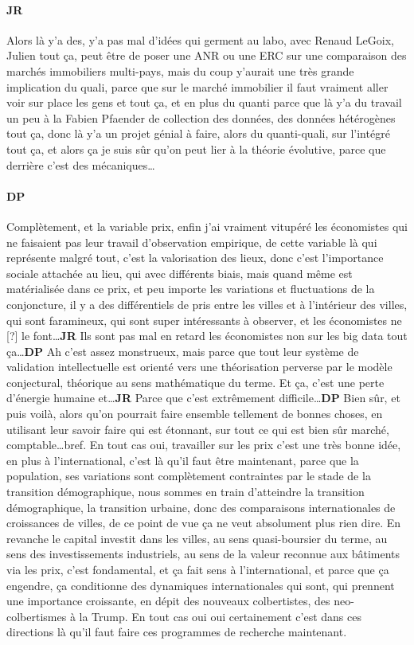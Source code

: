 \documentclass[12pt]{article}
\begin{document}
\paragraph{JR}

Alors là y'a des, y'a pas mal d'idées qui germent au labo, avec Renaud LeGoix, Julien tout ça, peut être de poser une ANR ou une ERC sur une comparaison des marchés immobiliers multi-pays, mais du coup y'aurait une très grande implication du quali, parce que sur le marché immobilier il faut vraiment aller voir sur place les gens et tout ça, et en plus du quanti parce que là y'a du travail un peu à la Fabien Pfaender de collection des données, des données hétérogènes tout ça, donc là y'a un projet génial à faire, alors du quanti-quali, sur l'intégré tout ça, et alors ça je suis sûr qu'on peut lier à la théorie évolutive, parce que derrière c'est des mécaniques\ldots

\paragraph{DP}

Complètement, et la variable prix, enfin j'ai vraiment vitupéré les économistes qui ne faisaient pas leur travail d'observation empirique, de cette variable là qui représente malgré tout, c'est la valorisation des lieux, donc c'est l'importance sociale attachée au lieu, qui avec différents biais, mais quand même est matérialisée dans ce prix, et peu importe les variations et fluctuations de la conjoncture, il y a des différentiels de pris entre les villes et à l'intérieur des villes, qui sont faramineux, qui sont super intéressants à observer, et les économistes ne [?] le font\ldots \textbf{JR} Ils sont pas mal en retard les économistes non sur les big data tout ça\ldots \textbf{DP} Ah c'est assez monstrueux, mais parce que tout leur système de validation intellectuelle est orienté vers une théorisation perverse par le modèle conjectural, théorique au sens mathématique du terme. Et ça, c'est une perte d'énergie humaine et\ldots \textbf{JR} Parce que c'est extrêmement difficile\ldots \textbf{DP} Bien sûr, et puis voilà, alors qu'on pourrait faire ensemble tellement de bonnes choses, en utilisant leur savoir faire qui est étonnant, sur tout ce qui est bien sûr marché, comptable\ldots bref. En tout cas oui, travailler sur les prix c'est une très bonne idée, en plus à l'international, c'est là qu'il faut être maintenant, parce que la population, ses variations sont complètement contraintes par le stade de la transition démographique, nous sommes en train d'atteindre la transition démographique, la transition urbaine, donc des comparaisons internationales de croissances de villes, de ce point de vue ça ne veut absolument plus rien dire. En revanche le capital investit dans les villes, au sens quasi-boursier du terme, au sens des investissements industriels, au sens de la valeur reconnue aux bâtiments via les prix, c'est fondamental, et ça fait sens à l'international, et parce que ça engendre, ça conditionne des dynamiques internationales qui sont, qui prennent une importance croissante, en dépit des nouveaux colbertistes, des neo-colbertismes à la Trump. En tout cas oui oui certainement c'est dans ces directions là qu'il faut faire ces programmes de recherche maintenant.
\end{document}

